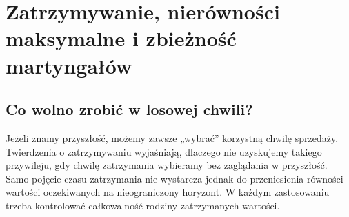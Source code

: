 \documentclass[11pt,a4paper,oneside]{report}
\numberwithin{equation}{chapter}
\theoremstyle{plain}
\theoremstyle{definition}
\theoremstyle{remark}
\begin{document}
\chapter{Zatrzymywanie, nierówności maksymalne i zbieżność martyngałów}
\label{ch:stop-cont}

\section{Co wolno zrobić w losowej chwili?}
Jeżeli znamy przyszłość, możemy zawsze „wybrać” korzystną
chwilę sprzedaży. Twierdzenia o zatrzymywaniu wyjaśniają,
dlaczego nie uzyskujemy takiego przywileju, gdy chwilę
zatrzymania wybieramy bez zaglądania w przyszłość.
Samo pojęcie czasu zatrzymania nie wystarcza jednak do
przeniesienia równości wartości oczekiwanych na nieograniczony
horyzont. W każdym zastosowaniu trzeba kontrolować
całkowalność rodziny zatrzymanych wartości.
\end{document}
